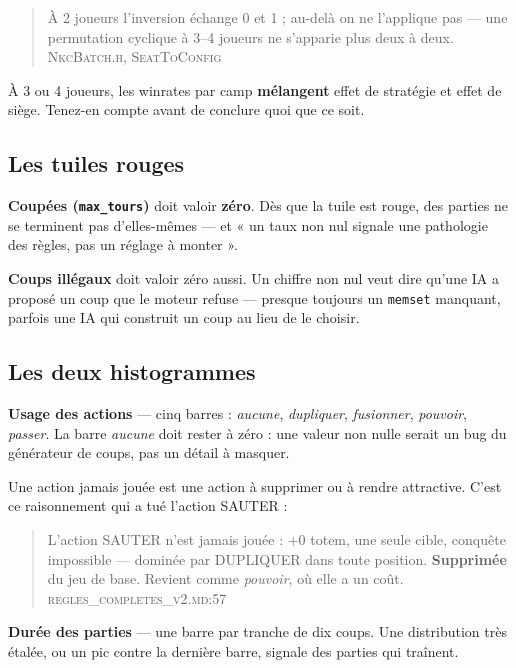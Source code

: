 \begin{nkpiege}
\begin{quote}\small
À 2 joueurs l'inversion échange 0 et 1 ; au-delà on ne l'applique pas — une
permutation cyclique à 3--4 joueurs ne s'apparie plus deux à deux.
\hfill\textsc{NkcBatch.h, SeatToConfig}
\end{quote}
À 3 ou 4 joueurs, les winrates par camp \textbf{mélangent} effet de stratégie et
effet de siège. Tenez-en compte avant de conclure quoi que ce soit.
\end{nkpiege}

\subsection{Les tuiles rouges}

\textbf{Coupées (\texttt{max\_tours})} doit valoir \textbf{zéro}. Dès que la tuile
est rouge, des parties ne se terminent pas d'elles-mêmes — et « un taux non nul
signale une pathologie des règles, pas un réglage à monter ».

\textbf{Coups illégaux} doit valoir zéro aussi. Un chiffre non nul veut dire
qu'une IA a proposé un coup que le moteur refuse — presque toujours un
\texttt{memset} manquant, parfois une IA qui construit un coup au lieu de le
choisir.

\subsection{Les deux histogrammes}

\textbf{Usage des actions} — cinq barres : \emph{aucune}, \emph{dupliquer},
\emph{fusionner}, \emph{pouvoir}, \emph{passer}. La barre \emph{aucune} doit
rester à zéro : une valeur non nulle serait un bug du générateur de coups, pas un
détail à masquer.

Une action jamais jouée est une action à supprimer ou à rendre attractive. C'est
ce raisonnement qui a tué l'action SAUTER :

\begin{quote}\small
L'action SAUTER n'est jamais jouée : $+0$ totem, une seule cible, conquête
impossible — dominée par DUPLIQUER dans toute position. \textbf{Supprimée} du jeu
de base. Revient comme \emph{pouvoir}, où elle a un coût.
\hfill\textsc{regles\_completes\_v2.md:57}
\end{quote}

\textbf{Durée des parties} — une barre par tranche de dix coups. Une distribution
très étalée, ou un pic contre la dernière barre, signale des parties qui traînent.

